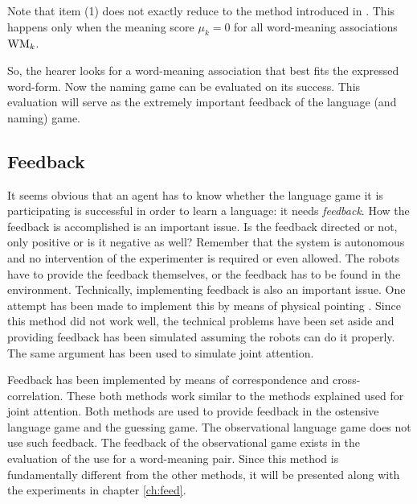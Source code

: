 \noindent
Note that item (1) does not exactly reduce to the method introduced in \cite{steels:1996a}. This happens only when the meaning score $\mu_k=0$ for all word-meaning associations ${\bf \mbox{WM}}_k$.

\p
So, the hearer looks for a word-meaning association that best fits the expressed word-form. Now the naming game can be evaluated on its success. This evaluation will serve as the extremely important feedback of the language (and naming) game.

\subsection{Feedback}\label{s:cm:feedback}

It seems obvious that an agent has to know whether the language game it is participating is successful in order to learn a language: it needs {\em feedback}. How the feedback is accomplished is an important issue. Is the feedback directed or not, only positive or is it negative as well? Remember that the system is autonomous and no intervention of the experimenter is required or even allowed. The robots have to provide the feedback themselves, or the feedback has to be found in the environment. Technically, implementing feedback is also an important issue. One attempt has been made to implement this by means of physical pointing \cite{steelsvogt:1997,vogt:1998b}. Since this method did not work well, the technical problems have been set aside and providing feedback has been simulated assuming the robots can do it properly. The same argument has been used to simulate joint attention.

\p
Feedback has been implemented by means of correspondence and cross-correlation. These both methods work similar to the methods explained used for joint attention. Both methods are used to provide feedback in the ostensive language game and the guessing game. The observational language game does not use such feedback. The feedback of the observational game exists in the evaluation of the use for a word-meaning pair. Since this method is fundamentally different from the other methods, it will be presented along with the experiments in chapter \ref{ch:feed}.

